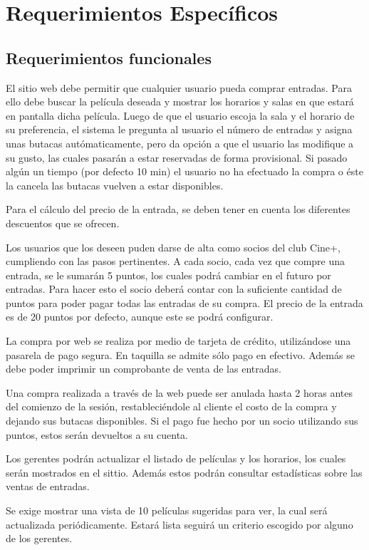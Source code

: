 \chapter{Requerimientos Específicos}\label{ch:req}

\section{Requerimientos funcionales}

El sitio web debe permitir que cualquier usuario pueda comprar entradas. Para ello debe buscar la película deseada y mostrar los horarios y salas en que estará en pantalla dicha película. Luego de que el usuario escoja la sala y el horario de su preferencia, el sistema le pregunta al usuario el número de entradas y asigna unas butacas autómaticamente, pero da opción a que el usuario las modifique a su gusto, las cuales pasarán a estar reservadas de forma provisional. Si pasado algún un tiempo (por defecto 10 min) el usuario no ha efectuado la compra o éste la cancela las butacas vuelven a estar disponibles.

Para el cálculo del precio de la entrada, se deben tener en cuenta los diferentes descuentos que se ofrecen.

Los usuarios que los deseen puden darse de alta como socios del club Cine+, cumpliendo con las pasos pertinentes. A cada socio, cada vez que compre una entrada, se le sumarán 5 puntos, los cuales podrá cambiar en el futuro por entradas. Para hacer esto el socio deberá contar con la suficiente cantidad de puntos para poder pagar todas las entradas de su compra. El precio de la entrada es de 20 puntos por defecto, aunque este se podrá configurar.

La compra por web se realiza por medio de tarjeta de crédito, utilizándose una pasarela de pago segura. En taquilla se admite sólo pago en efectivo. Además se debe poder imprimir un comprobante de venta de las entradas.

Una compra realizada a través de la web puede ser anulada hasta 2 horas antes del comienzo  de la sesión, restableciéndole al cliente el costo de la compra y dejando sus butacas disponibles. Si el pago fue hecho por un socio utilizando sus puntos, estos serán devueltos a su cuenta.

Los gerentes podrán actualizar el listado de películas y los horarios, los cuales serán mostrados en el sittio. Además estos podrán consultar estadísticas sobre las ventas de entradas.

Se exige mostrar una vista de 10 películas sugeridas para ver, la cual será actualizada periódicamente. Estará lista seguirá un criterio escogido por alguno de los gerentes.

